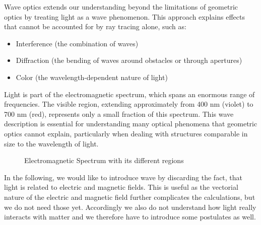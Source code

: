 \documentclass[
  a4paper,
]{book}
\providecommand{\tightlist}{%
  \setlength{\itemsep}{0pt}\setlength{\parskip}{0pt}}
\begin{document}
Wave optics extends our understanding beyond the limitations of
geometric optics by treating light as a wave phenomenon. This approach
explains effects that cannot be accounted for by ray tracing alone, such
as:

\begin{itemize}
\tightlist
\item
  Interference (the combination of waves)
\item
  Diffraction (the bending of waves around obstacles or through
  apertures)
\item
  Color (the wavelength-dependent nature of light)
\end{itemize}

Light is part of the electromagnetic spectrum, which spans an enormous
range of frequencies. The visible region, extending approximately from
400 nm (violet) to 700 nm (red), represents only a small fraction of
this spectrum. This wave description is essential for understanding many
optical phenomena that geometric optics cannot explain, particularly
when dealing with structures comparable in size to the wavelength of
light.

\begin{figure}


\caption{\label{fig-spectrum}Electromagnetic Spectrum with its different
regions}

\end{figure}%

In the following, we would like to introduce wave by discarding the
fact, that light is related to electric and magnetic fields. This is
useful as the vectorial nature of the electric and magnetic field
further complicates the calculations, but we do not need those yet.
Accordingly we also do not understand how light really interacts with
matter and we therefore have to introduce some postulates as well.
\end{document}

